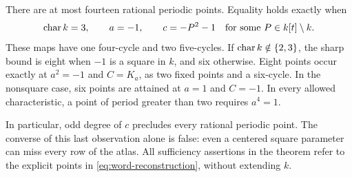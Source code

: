 \begin{theorem}\label{thm:bound}
There are at most fourteen rational periodic points. Equality holds
exactly when
\begin{equation}\label{eq:equality}
 \operatorname{char} k=3,\qquad a=-1,\qquad c=-P^2-1
 \quad\text{for some }P\in k[t]\setminus k.
\end{equation}
These maps have one four-cycle and two five-cycles.
If $\operatorname{char} k\notin\{2,3\}$, the sharp bound is eight when $-1$ is a
square in $k$, and six otherwise. Eight points occur exactly at
$a^2=-1$ and $C=K_a$, as two fixed points and a six-cycle. In the
nonsquare case, six points are attained at $a=1$ and $C=-1$.
In every allowed characteristic, a point of period greater than two
requires $a^4=1$.
\end{theorem}

In particular, odd degree of $c$ precludes every rational periodic
point. The converse of this last observation alone is false:
even a centered square parameter can miss every row of the atlas.
All sufficiency assertions in the theorem refer to the explicit
points in \eqref{eq:word-reconstruction}, without extending $k$.
